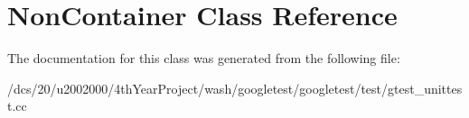 \hypertarget{classNonContainer}{}\section{Non\+Container Class Reference}
\label{classNonContainer}


The documentation for this class was generated from the following file\+:\begin{DoxyCompactItemize}
\item 
/dcs/20/u2002000/4th\+Year\+Project/wash/googletest/googletest/test/gtest\+\_\+unittest.\+cc\end{DoxyCompactItemize}
